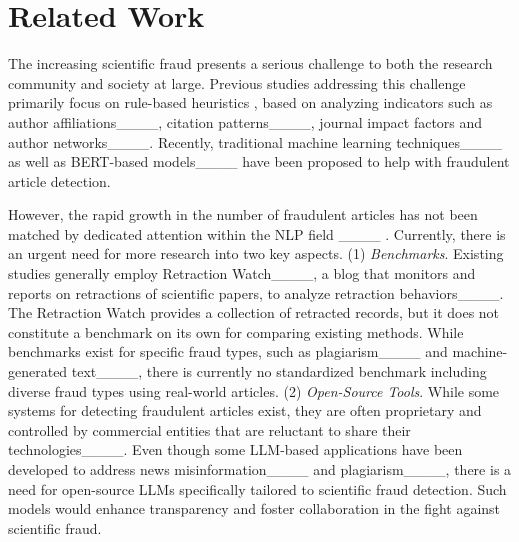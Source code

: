 \section{Related Work}
The increasing scientific fraud presents a serious challenge to both the research community and society at large. Previous studies addressing this challenge primarily focus on rule-based heuristics%
, based on analyzing indicators such as author affiliations____, citation patterns____, journal impact factors and author networks____. 
Recently, traditional machine learning techniques____ as well as BERT-based models____ have been proposed to help with fraudulent article detection. 


However,  %
the rapid growth in the number of fraudulent articles %
has not been matched by dedicated attention within the NLP field %
____%
. Currently, there is an urgent need for more research into two key aspects.  (1) \emph{Benchmarks}.  
Existing studies generally employ Retraction Watch____, a blog that monitors and reports on retractions of scientific papers, to analyze retraction behaviors____.
The Retraction Watch provides a collection of retracted records, but it does not constitute a benchmark on its own for comparing existing methods.
While benchmarks exist for specific fraud types, such as plagiarism____ and machine-generated text____, there is currently no standardized benchmark including diverse fraud types using real-world articles.
(2) \emph{Open-Source Tools}. While some systems for detecting fraudulent articles %
exist, they are often proprietary and controlled by commercial entities that are reluctant to share their technologies____.
Even though some LLM-based applications have been developed to address news misinformation____ and plagiarism____, there is a need for open-source LLMs specifically tailored to scientific fraud detection.
Such models would enhance transparency and foster collaboration in the fight against scientific fraud.

